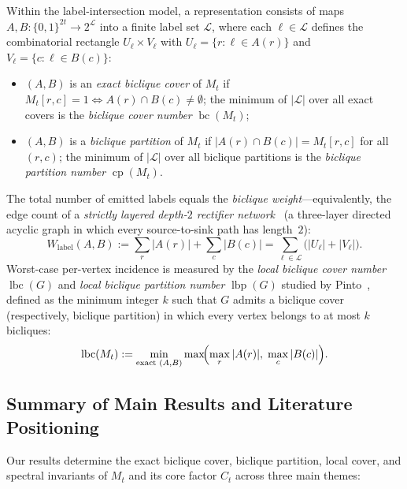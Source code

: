 \documentclass[11pt,reqno]{amsart}
\theoremstyle{definition}
\theoremstyle{remark}
\DeclareMathOperator{\bc}{bc}
\DeclareMathOperator{\cp}{cp}
\DeclareMathOperator{\lbc}{lbc}
\DeclareMathOperator{\lbp}{lbp}
\numberwithin{equation}{section}
\begin{document}
Within the label-intersection model, a representation consists of maps $A, B : \{0, 1\}^{2t} \to 2^{\mathcal{L}}$ into a finite label set $\mathcal{L}$, where each $\ell \in \mathcal{L}$ defines the combinatorial rectangle $U_\ell \times V_\ell$ with $U_\ell = \{r : \ell \in A(r)\}$ and $V_\ell = \{c : \ell \in B(c)\}$:
\begin{itemize}[leftmargin=2em]
  \item $(A, B)$ is an \emph{exact biclique cover} of $M_t$ if $M_t[r, c] = 1 \iff A(r) \cap B(c) \neq \emptyset$; the minimum of $|\mathcal{L}|$ over all exact covers is the \emph{biclique cover number} $\bc(M_t)$;
  \item $(A, B)$ is a \emph{biclique partition} of $M_t$ if $|A(r) \cap B(c)| = M_t[r, c]$ for all $(r, c)$; the minimum of $|\mathcal{L}|$ over all biclique partitions is the \emph{biclique partition number} $\cp(M_t)$.
\end{itemize}
The total number of emitted labels equals the \emph{biclique weight}---equivalently, the edge count of a \emph{strictly layered depth-$2$ rectifier network}~\cite{Juk12,ILNS14,CILS17} (a three-layer directed acyclic graph in which every source-to-sink path has length~$2$):
\[
  W_{\mathrm{label}}(A, B) := \sum_{r} |A(r)| + \sum_{c} |B(c)| = \sum_{\ell \in \mathcal{L}} \bigl(|U_\ell| + |V_\ell|\bigr).
\]
Worst-case per-vertex incidence is measured by the \emph{local biclique cover number} $\lbc(G)$ and \emph{local biclique partition number} $\lbp(G)$ studied by Pinto~\cite{Pin14}, defined as the minimum integer $k$ such that $G$ admits a biclique cover (respectively, biclique partition) in which every vertex belongs to at most $k$ bicliques:
\[
  \lbc(M_t) := \min_{\text{exact }(A,B)} \max\!\Bigl(\max_{r} |A(r)|,\; \max_{c} |B(c)|\Bigr).
\]

\subsection{Summary of Main Results and Literature Positioning}
Our results determine the exact biclique cover, biclique partition, local cover, and spectral invariants of $M_t$ and its core factor $C_t$ across three main themes:
\end{document}
